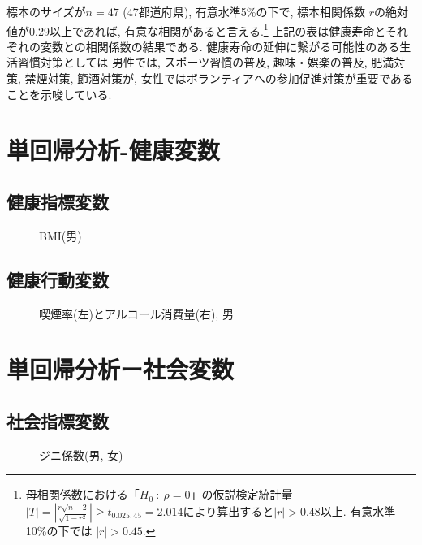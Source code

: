 標本のサイズが$n=47$
(47都道府県), 有意水準5\%の下で, 標本相関係数 $r$の絶対値が0.29以上であれば, 有意な相関があると言える.\footnote{母相関係数における「$H_0 ~: ~\rho=0$」の仮説検定統計量
	$|T|=\left|\frac{r\sqrt{n-2}}{\sqrt{1-r^2}}\right|
		\ge t_{0.025, 45}=2.014$により算出すると$|r|>0.48$以上.
	有意水準10\%の下では
	$|r|>0.45$.
}
上記の表は健康寿命とそれぞれの変数との相関係数の結果である.
健康寿命の延伸に繋がる可能性のある生活習慣対策としては
男性では, スポーツ習慣の普及, 趣味・娯楽の普及, 肥満対策, 禁煙対策, 節酒対策が,
女性ではボランティアへの参加促進対策が重要であることを示唆している.
\section{単回帰分析-健康変数}
\subsection{健康指標変数}
\begin{figure}[h!]
	\begin{center}
		\caption{BMI(男)}\end{center}
\end{figure}


\subsection{健康行動変数}
\begin{figure}[h!]
	\begin{center}
		\caption{喫煙率(左)とアルコール消費量(右), 男}\end{center}
\end{figure}




\section{単回帰分析ー社会変数}
\subsection{社会指標変数}
\begin{figure}[H]
	\begin{center}
		\caption{ジニ係数(男, 女)}
	\end{center}
\end{figure}

